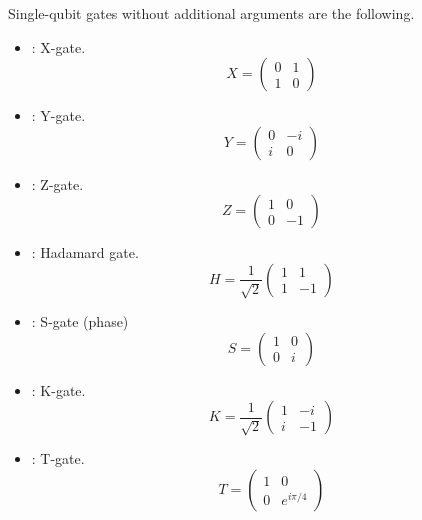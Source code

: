 Single-qubit gates without additional arguments are the following.
\begin{itemize}
  \item {}: X-gate.
        \begin{equation}\label{eq:pauli_x}
          X = \begin{pmatrix} 0 & 1 \\ 1 & 0 \end{pmatrix}
        \end{equation}
  \item {}: Y-gate.
        \begin{equation}\label{eq:pauli_y}
          Y = \begin{pmatrix} 0 & -i \\ i & 0 \end{pmatrix}
        \end{equation}
  \item {}: Z-gate.
        \begin{equation}\label{eq:pauli_z}
          Z = \begin{pmatrix} 1 & 0 \\ 0 & -1 \end{pmatrix}
        \end{equation}
  \item {}: Hadamard gate.
        \begin{equation}
          H = \frac{1}{\sqrt{2}} \begin{pmatrix} 1 & 1 \\ 1 & -1 \end{pmatrix}
        \end{equation}
  \item {}: S-gate (phase)
        \begin{equation}
          S = \begin{pmatrix} 1 & 0 \\ 0 & i \end{pmatrix}
        \end{equation}
  \item {}: K-gate.
        \begin{equation}
          K = \frac{1}{\sqrt{2}} \begin{pmatrix} 1 & -i \\ i & -1 \end{pmatrix}
        \end{equation}
  \item {}: T-gate.
        \begin{equation}
          T = \begin{pmatrix} 1 & 0 \\ 0 & e^{i\pi/4} \end{pmatrix}
        \end{equation}
\end{itemize}

